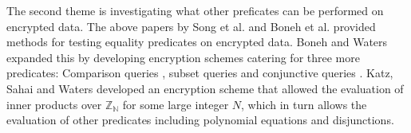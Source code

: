 \documentclass[a4paper,11pt]{article}
\begin{document}
    The second theme is investigating what other preficates can be performed on encrypted data. The above papers by Song et al. and Boneh et al. provided methods for testing equality predicates on encrypted data. Boneh and Waters\cite{boneh:predicate} expanded this by developing encryption schemes catering for three more predicates: Comparison queries , subset queries and conjunctive queries . Katz, Sahai and Waters\cite{katz:predicate} developed an encryption scheme that allowed the evaluation of inner products over $\mathbb{Z_N}$ for some large integer $N$, which in turn allows the evaluation of other predicates including polynomial equations and disjunctions.

    \printbibliography
\end{document}
